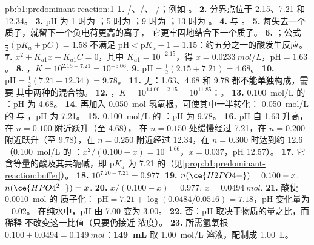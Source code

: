 \begin{solution}{pb:b1:predominant-reaction:1}
\textbf{1.} /、/、
/；例如 。
\textbf{2.} 分界点位于 2.15、7.21 和 12.34。
\textbf{3.} pH 为 1 时为 ；5 时为 ；9 时为 ；13 时为
。
\textbf{4.}  与 。
\textbf{5.} 每失去一个质子，就留下一个负电荷更高的离子，
它更牢固地结合下一个质子。
\textbf{6.} ；公式
$\frac12(\mathrm{p}K_a + \mathrm{p}C) = 1.58$ 不满足 $\mathrm{pH} <
\mathrm{p}K_a - 1 = 1.15$：约五分之一的酸发生反应。
\textbf{7.} $x^2 + K_{a1}x - K_{a1}C = 0$，其中 $K_{a1} = 10^{-2.15}$，得 $x =
\qty{0.0233}{mol/L}$，$\mathrm{pH} = 1.63$。
\textbf{8.} ，$K = 10^{2.15 - 7.21} =
10^{-5.06}$.
\textbf{9.} $\mathrm{pH} = \frac12(2.15 + 7.21) = 4.68$。
\textbf{10.} $\mathrm{pH} = \frac12(7.21 + 12.34) = 9.78$。
\textbf{11.} 无：1.63、4.68 和 9.78 都不能单独构成，需要
其中两种的混合物。
\textbf{12.} ，$K = 10^{14.00 - 2.15} =
10^{11.85}$：。
\textbf{13.} \qty{0.100}{mol/L} 的 ：pH 为 4.68。
\textbf{14.} 再加入 \qty{0.050}{mol} 氢氧根，可使其中一半转化：
\qty{0.050}{mol/L} 的  与 ，pH 为 7.21。
\textbf{15.} \qty{0.100}{mol/L} 的 ：pH 为 9.78。
\textbf{16.} pH 自 1.63 升高，在 $n = 0.100$ 附近跃升（至 4.68），
在 $n = 0.150$ 处缓慢经过 7.21，在 $n = 0.200$ 附近跃升（至
9.78），在 $n = 0.250$ 附近经过 12.34，在 $n = 0.300$ 时达到约 12.6（\qty{0.100}{mol/L} 的 ：$x^2/(0.100 - x) = 10^{-1.66}$，$x = 0.037$，pH 12.57）。
\textbf{17.} 它含等量的酸及其共轭碱，即
$\mathrm{p}K_a$ 为 7.21 的（见\cref{prop:b1:predominant-reaction:buffer}）。
\textbf{18.} $10^{7.20 - 7.21} = 0.977$.
\textbf{19.} $n(\ce{H2PO4-}) = 0.100 - x$, $n(\ce{HPO4^{2-}}) = x$.
\textbf{20.} $x/(0.100 - x) = 0.977$, $x = \qty{0.0494}{mol}$.
\textbf{21.} 酸使 \qty{0.0010}{mol} 的  质子化：
$\mathrm{pH} = 7.21 + \log(0.0484/0.0516) = 7.18$，pH 变化量为 $-0.02$。
在纯水中，pH 由 7.00 变为 3.00。
\textbf{22.} 否：pH 取决于物质的量之比，而稀释
不改变这一比值（只要仍接近
浓度）。
\textbf{23.} 所需氢氧根 $0.100 + 0.0494 = \qty{0.149}{mol}$：\textbf{\qty{149}{mL}}
取 \qty{1.00}{mol/L} 溶液，配制成 \qty{1.00}{L}。
\end{solution}
